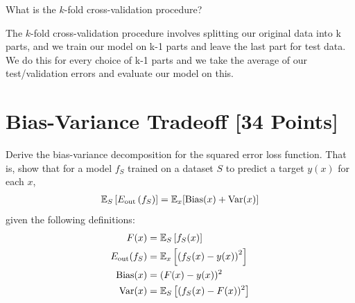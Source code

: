 \begin{problem}[2]
  What is the $k$-fold cross-validation procedure?
\end{problem}
\begin{solution}
  The $k$-fold cross-validation procedure involves splitting our original data into k parts, and we train our model on k-1 parts and leave the last part for test data. We do this for every choice of k-1 parts and we take the average of our test/validation errors and evaluate our model on this.
\end{solution}




\newpage
\section{Bias-Variance Tradeoff [34 Points]}

\begin{problem}[5]
  Derive the bias-variance decomposition for the squared error loss function. That is, show that for a model $f_S$ trained on a dataset $S$ to predict a target $y(x)$ for each $x$,
  \begin{align*}
    \mathbb{E}_S \left[E_\text{out}\left(f_S\right)\right] = \mathbb{E}_x[\operatorname{Bias}(x) + \operatorname{Var}(x)]
  \end{align*}
  given the following definitions:
  \begin{align*}
    F(x) &= \mathbb{E}_S\left[f_S(x) \right] \\
    E_\text{out}(f_S) &= \mathbb{E}_x\left[\left(f_S(x) - y(x)\right)^2\right] \\
    \operatorname{Bias}(x) &= (F(x) - y(x))^2 \\
    \operatorname{Var}(x) &= \mathbb{E}_S\left[(f_S(x)-F(x))^2\right]
  \end{align*}
\end{problem}

